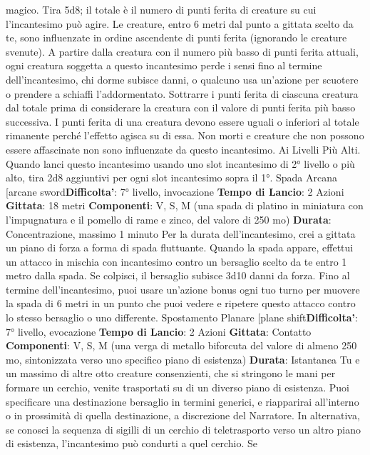 \begin{multicols}{2}
magico. Tira 5d8; il totale è il numero di punti ferita di
creature su cui l’incantesimo può agire. Le creature,
entro 6 metri dal punto a gittata scelto da te, sono
influenzate in ordine ascendente di punti ferita
(ignorando le creature svenute).
A partire dalla creatura con il numero più basso di punti
ferita attuali, ogni creatura soggetta a questo
incantesimo perde i sensi fino al termine
dell’incantesimo, chi dorme subisce danni, o qualcuno
usa un’azione per scuotere o prendere a schiaffi
l’addormentato. Sottrarre i punti ferita di ciascuna
creatura dal totale prima di considerare la creatura con
il valore di punti ferita più basso successiva. I punti
ferita di una creatura devono essere uguali o inferiori al
totale rimanente perché l’effetto agisca su di essa.
Non morti e creature che non possono essere
affascinate non sono influenzate da questo
incantesimo.
Ai Livelli Più Alti. Quando lanci questo incantesimo
usando uno slot incantesimo di 2° livello o più alto, tira
2d8 aggiuntivi per ogni slot incantesimo sopra il 1°.
Spada Arcana
[arcane sword\textbf{Difficolta'}:
7° livello, invocazione
\textbf{Tempo di Lancio}: 2 Azioni
\textbf{Gittata}: 18 metri
\textbf{Componenti}: V, S, M (una spada di platino in miniatura
con l’impugnatura e il pomello di rame e zinco, del
valore di 250 mo)
\textbf{Durata}: Concentrazione, massimo 1 minuto
Per la durata dell’incantesimo, crei a gittata un piano di
forza a forma di spada fluttuante.
Quando la spada appare, effettui un attacco in mischia
con incantesimo contro un bersaglio scelto da te entro
1 metro dalla spada. Se colpisci, il bersaglio subisce
3d10 danni da forza. Fino al termine dell’incantesimo,
puoi usare un’azione bonus ogni tuo turno per muovere
la spada di 6 metri in un punto che puoi vedere e
ripetere questo attacco contro lo stesso bersaglio o uno
differente.
Spostamento Planare
[plane shift\textbf{Difficolta'}:
7° livello, evocazione
\textbf{Tempo di Lancio}: 2 Azioni
\textbf{Gittata}: Contatto
\textbf{Componenti}: V, S, M (una verga di metallo biforcuta
del valore di almeno 250 mo, sintonizzata verso uno
specifico piano di esistenza)
\textbf{Durata}: Istantanea
Tu e un massimo di altre otto creature consenzienti,
che si stringono le mani per formare un cerchio, venite
trasportati su di un diverso piano di esistenza. Puoi
specificare una destinazione bersaglio in termini
generici, e riapparirai all’interno o in prossimità di quella
destinazione, a discrezione del Narratore.
In alternativa, se conosci la sequenza di sigilli di un
cerchio di teletrasporto verso un altro piano di
esistenza, l’incantesimo può condurti a quel cerchio. Se

\end{multicols}
